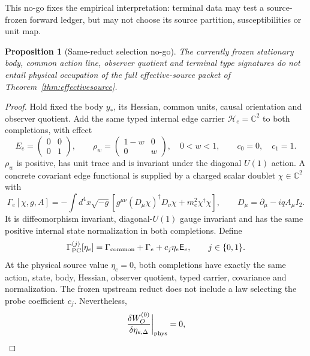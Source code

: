 \documentclass[11pt]{article}
\newtheorem{proposition}{Proposition}
\begin{document}
This no-go fixes the empirical interpretation: terminal data may test a
source-frozen forward ledger, but may not choose its source partition,
susceptibilities or unit map.

\begin{proposition}[Same-reduct selection no-go]
\label{prop:samereduct}
The currently frozen stationary body, common action line, observer quotient
and terminal type signatures do not entail physical occupation of the full
effective-source packet of Theorem~\ref{thm:effectivesource}.
\end{proposition}
\begin{proof}
Hold fixed the body $y_*$, its Hessian, common units, causal orientation and
observer quotient.  Add the same typed internal edge carrier
$\mathcal H_e=\mathbb C^2$ to both completions, with effect
\begin{equation}
E_e=\begin{pmatrix}0&0\\0&1\end{pmatrix},\qquad
\rho_w=\begin{pmatrix}1-w&0\\0&w\end{pmatrix},
\quad 0<w<1,\qquad c_0=0,\quad c_1=1.
\label{eq:counterpair}
\end{equation}
$\rho_w$ is positive, has unit trace and is invariant under the diagonal
$U(1)$ action.  A concrete covariant edge functional is supplied by
a charged scalar doublet $\chi\in\mathbb C^2$ with
\begin{equation}
\Gamma_e[\chi,g,A]
=-\int d^4x\sqrt{-g}\left[
g^{\mu\nu}(D_\mu\chi)^\dagger D_\nu\chi
+m_e^2\chi^\dagger\chi\right],
\qquad D_\mu=\partial_\mu-iqA_\mu I_2 .
\label{eq:counteredgeaction}
\end{equation}
It is diffeomorphism invariant, diagonal-$U(1)$ gauge invariant and has the
same positive internal state normalization in both completions.  Define
\begin{equation}
\Gamma_{\rm PC}^{(j)}[\eta_e]
=\Gamma_{\rm common}+\Gamma_e+c_j\eta_e\mathsf E_e,
\qquad j\in\{0,1\}.
\label{eq:counterprobes}
\end{equation}
At the physical source value $\eta_e=0$, both completions have exactly the
same action, state, body, Hessian, observer quotient, typed carrier,
covariance and normalization.  The frozen upstream reduct does not include a
law selecting the probe coefficient $c_j$.  Nevertheless,
\begin{equation}
{\delta W_O^{(0)}\over\delta\eta_{e,\Delta}}\bigg|_{\rm phys}=0,

\end{equation}
\end{proof}
\end{document}
